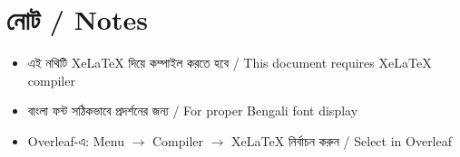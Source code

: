 \documentclass[12pt]{article}
\begin{document}
\vspace{2em}

\section*{নোট / Notes}

\begin{itemize}
    \item এই নথিটি XeLaTeX দিয়ে কম্পাইল করতে হবে / This document requires XeLaTeX compiler
    \item বাংলা ফন্ট সঠিকভাবে প্রদর্শনের জন্য / For proper Bengali font display
    \item Overleaf-এ: Menu $\to$ Compiler $\to$ XeLaTeX নির্বাচন করুন / Select in Overleaf
\end{itemize}
\end{document}
